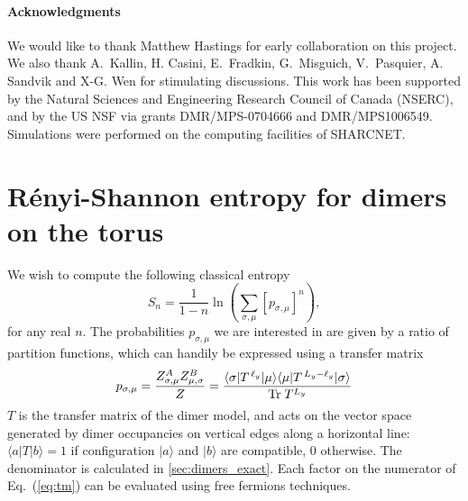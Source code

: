 \documentclass[11pt]{iopart}
\begin{document}
\paragraph{Acknowledgments}
 We would like to thank Matthew Hastings for early collaboration on this project. We also thank  A.\ Kallin, H. Casini, E.\ Fradkin, G.\ Misguich, V.\  Pasquier, A. Sandvik and X-G. Wen for stimulating discussions. This work has been supported by the Natural Sciences and Engineering
Research Council of Canada (NSERC), and by the US NSF via grants DMR/MPS-0704666 and DMR/MPS1006549.   Simulations were performed on the computing facilities of SHARCNET.

 \appendix
 \clearpage

\section[\;\;\;\;\;\;\;\;\;\;\;\;\;\;R\'enyi-Shannon entropy on the torus]{R\'enyi-Shannon entropy for dimers on the torus}
\label{sec:lgv}
We wish to compute the following classical entropy
\begin{equation}
 S_n=\frac{1}{1-n} \ln \left(\sum_{\sigma,\mu} [p_{\sigma,\mu}]^n\right), 
\end{equation}
for any real $n$. The probabilities $p_{\sigma,\mu}$ we are interested in are given by a ratio of partition functions, which can handily be expressed using a transfer matrix
\begin{equation}\label{eq:tm}
 p_{\sigma,\mu}=\frac{Z_{\sigma,\mu}^A Z_{\mu,\sigma}^B}{Z}=\frac{\langle  \sigma|T^{\,\ell_y}|\mu\rangle\langle \mu|T^{\,L_y-\ell_y}|\sigma\rangle}{{\rm Tr}\; T^{L_y}}
\end{equation}
$T$ is the transfer matrix of the dimer model, and acts on the vector space generated by dimer occupancies on vertical edges along a horizontal line: $\langle a|T|b\rangle=1$ if configuration $|a\rangle$ and $|b\rangle$ are compatible, $0$ otherwise. The denominator is calculated in \ref{sec:dimers_exact}. Each factor on the numerator of Eq.~(\ref{eq:tm}) can be evaluated using free fermions techniques\cite{Lieb1967,Alet_dimers2,Shannonee}. 
\end{document}
